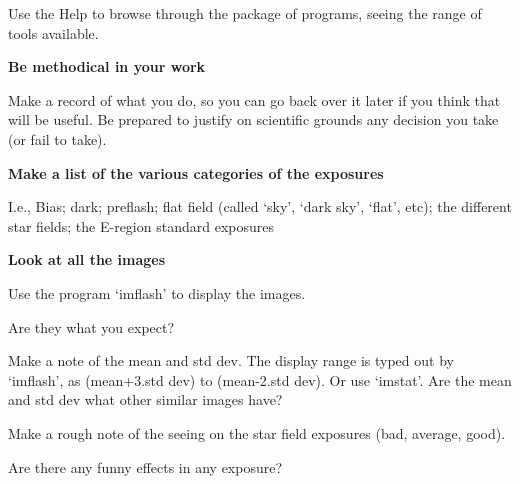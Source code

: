 \begin{small}
{{ Use the Help to browse through the \starman package
 of programs, seeing the range of tools available.

{\hspace*{4ex} \bf   Be methodical in your work}

 Make a record of what you do, so you can go back over it later if you
 think that will be useful. Be prepared to justify on scientific grounds
 any decision you take (or fail to take).

{\hspace*{4ex} \bf   Make a list of the various categories of the exposures}

 I.e., Bias; dark; preflash; flat field (called `sky', `dark sky',
 `flat', etc); the different star fields; the E-region standard
 exposures

{\hspace*{4ex} \bf   Look at all the images}

 Use the \starman program `imflash' to display the images.

 Are they what you expect?

 Make a note of the mean and std dev. The display range is typed
 out by `imflash', as (mean+3.std dev) to (mean-2.std dev). Or use
 `imstat'. Are the mean and std dev what other similar images have?

 Make a rough note of the seeing on the star field exposures
 (bad, average, good).

 Are there any funny effects in any exposure?

}}
\end{small}

